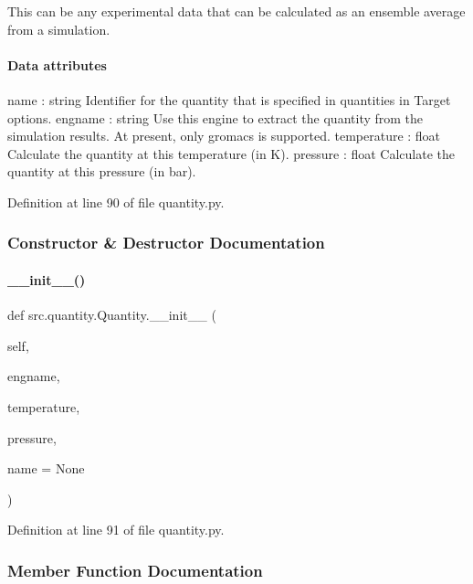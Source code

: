 This can be any experimental data that can be calculated as an ensemble average from a simulation.

\paragraph*{Data attributes }

name \+: string Identifier for the quantity that is specified in {\ttfamily quantities} in Target options. engname \+: string Use this engine to extract the quantity from the simulation results. At present, only {\ttfamily gromacs} is supported. temperature \+: float Calculate the quantity at this temperature (in K). pressure \+: float Calculate the quantity at this pressure (in bar). 

Definition at line 90 of file quantity.\+py.



\subsubsection{Constructor \& Destructor Documentation}
\mbox{\label{classsrc_1_1quantity_1_1Quantity_a47b1d34c21e799aeeebc184ccb40f0c9}} 
\paragraph{\texorpdfstring{\+\_\+\+\_\+init\+\_\+\+\_\+()}{\_\_init\_\_()}}
{\footnotesize\ttfamily def src.\+quantity.\+Quantity.\+\_\+\+\_\+init\+\_\+\+\_\+ (\begin{DoxyParamCaption}\item[{}]{self,  }\item[{}]{engname,  }\item[{}]{temperature,  }\item[{}]{pressure,  }\item[{}]{name = {\ttfamily None} }\end{DoxyParamCaption})}



Definition at line 91 of file quantity.\+py.



\subsubsection{Member Function Documentation}
\mbox{\label{classsrc_1_1quantity_1_1Quantity_a75f05aea06603e7830b17c4fb4f5264f}} 
